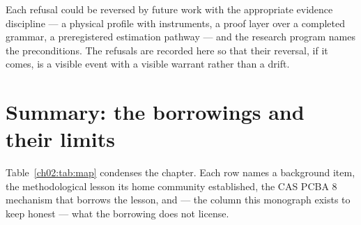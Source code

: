 Each refusal could be reversed by future work with the appropriate
evidence discipline --- a physical profile with instruments, a proof
layer over a completed grammar, a preregistered estimation pathway ---
and the research program names the preconditions. The refusals are
recorded here so that their reversal, if it comes, is a visible event
with a visible warrant rather than a drift.

\section{Summary: the borrowings and their limits}\label{ch02:summary}

Table~\ref{ch02:tab:map} condenses the chapter. Each row names a
background item, the methodological lesson its home community
established, the CAS PCBA 8 mechanism that borrows the lesson, and ---
the column this monograph exists to keep honest --- what the borrowing
does not license.

